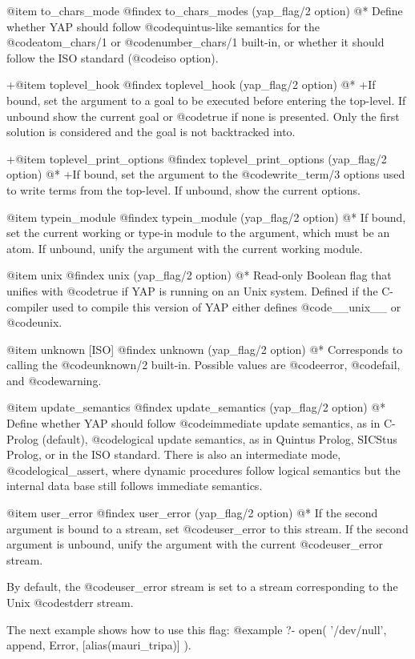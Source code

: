 {{{{{{{{{@item to_chars_mode
@findex to_chars_modes (yap_flag/2 option)
@* Define whether YAP should follow @code{quintus}-like
semantics for the @code{atom_chars/1} or @code{number_chars/1} built-in,
or whether it should follow the ISO standard (@code{iso} option).

+@item toplevel_hook
@findex toplevel_hook (yap_flag/2 option)
@*
+If bound, set the argument to a goal to be executed before entering the
top-level. If unbound show the current goal or @code{true} if none is
presented. Only the first solution is considered and the goal is not
backtracked into.

+@item toplevel_print_options
@findex toplevel_print_options (yap_flag/2 option)
@*
+If bound, set the argument to the @code{write_term/3} options used to write
terms from the top-level. If unbound, show the current options.

@item typein_module
@findex typein_module (yap_flag/2 option)
@*
If bound, set the current working or type-in module to the argument,
which must be an atom. If unbound, unify the argument with the current
working module.

@item  unix
@findex unix (yap_flag/2 option)
@* Read-only Boolean flag that unifies with @code{true} if YAP is
running on an Unix system.  Defined if the C-compiler used to compile
this version of YAP either defines @code{__unix__} or @code{unix}.

@item unknown [ISO]
@findex unknown (yap_flag/2 option)
@*
Corresponds to calling the @code{unknown/2} built-in. Possible values 
are @code{error}, @code{fail}, and @code{warning}.

@item update_semantics
@findex update_semantics (yap_flag/2 option)
@*
Define whether YAP should follow @code{immediate} update
semantics, as in C-Prolog (default), @code{logical} update semantics,
as in Quintus Prolog, SICStus Prolog, or in the ISO standard. There is
also an intermediate mode, @code{logical_assert}, where dynamic
procedures follow logical semantics but the internal data base still
follows immediate semantics.

@item user_error
@findex user_error (yap_flag/2 option)
@*
If the second argument is bound to a stream, set @code{user_error} to
this stream. If the second argument is unbound, unify the argument with
the current @code{user_error} stream.

By default, the @code{user_error} stream is set to a stream
corresponding to the Unix @code{stderr} stream.

The next example shows how to use this flag:
@example
   ?- open( '/dev/null', append, Error,
           [alias(mauri_tripa)] ).

}}}}}}}}}
